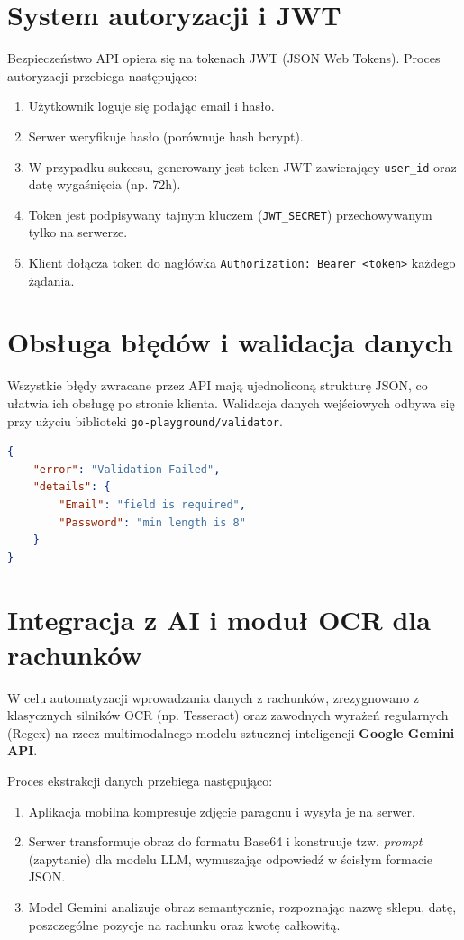 \section{System autoryzacji i JWT}

Bezpieczeństwo API opiera się na tokenach JWT (JSON Web Tokens). Proces autoryzacji przebiega następująco:
\begin{enumerate}
    \item Użytkownik loguje się podając email i hasło.
    \item Serwer weryfikuje hasło (porównuje hash bcrypt).
    \item W przypadku sukcesu, generowany jest token JWT zawierający \texttt{user\_id} oraz datę wygaśnięcia (np. 72h).
    \item Token jest podpisywany tajnym kluczem (\texttt{JWT\_SECRET}) przechowywanym tylko na serwerze.
    \item Klient dołącza token do nagłówka \texttt{Authorization: Bearer <token>} każdego żądania.
\end{enumerate}

\section{Obsługa błędów i walidacja danych}

Wszystkie błędy zwracane przez API mają ujednoliconą strukturę JSON, co ułatwia ich obsługę po stronie klienta. Walidacja danych wejściowych odbywa się przy użyciu biblioteki \texttt{go-playground/validator}.

\begin{lstlisting}[language=json, caption=Struktura błędu API, label=json:error]
{
    "error": "Validation Failed",
    "details": {
        "Email": "field is required",
        "Password": "min length is 8"
    }
}
\end{lstlisting}

\section{Integracja z AI i moduł OCR dla rachunków}

W celu automatyzacji wprowadzania danych z rachunków, zrezygnowano z klasycznych silników OCR (np. Tesseract) oraz zawodnych wyrażeń regularnych (Regex) na rzecz multimodalnego modelu sztucznej inteligencji \textbf{Google Gemini API}.

Proces ekstrakcji danych przebiega następująco:
\begin{enumerate}
    \item Aplikacja mobilna kompresuje zdjęcie paragonu i wysyła je na serwer.
    \item Serwer transformuje obraz do formatu Base64 i konstruuje tzw. \textit{prompt} (zapytanie) dla modelu LLM, wymuszając odpowiedź w ścisłym formacie JSON.
    \item Model Gemini analizuje obraz semantycznie, rozpoznając nazwę sklepu, datę, poszczególne pozycje na rachunku oraz kwotę całkowitą.
\end{enumerate}


